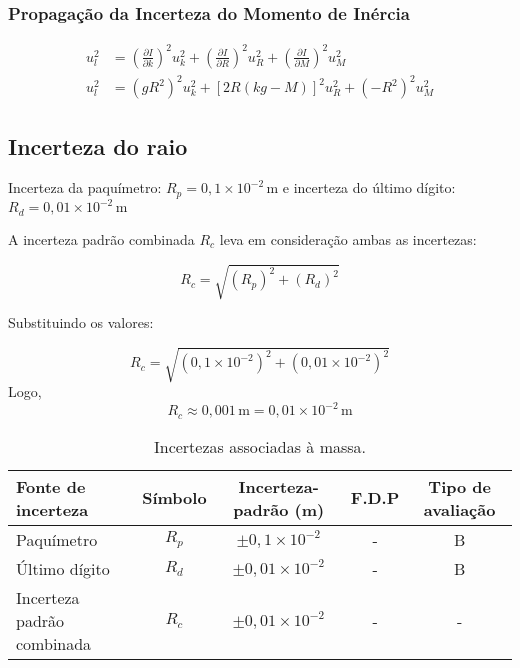 \documentclass[a4papper, 10pt]{article}
\begin{document}
\subsubsection{Propagação da Incerteza do Momento de Inércia}
\vspace{0.10 cm}
\begin{center}
\begin{equation*}
\boxed{
\begin{aligned}
u_l^2 &= \left(\frac{\partial I}{\partial k}\right)^2 u_k^2 + \left(\frac{\partial I}{\partial R}\right)^2 u_R^2 + \left(\frac{\partial I}{\partial M}\right)^2 u_M^2 \\
u_l^2 &= (gR^2)^2 u_k^2 + \left[2R(kg - M)\right]^2 u_R^2 + \left(-R^2\right)^2 u_M^2
\end{aligned}
}
\end{equation*}
\end{center}
\vspace{0.10 cm}

\subsection{Incerteza do raio}

Incerteza da paquímetro: \( R_p = 0{,}1 \times 10^{-2} \, \text{m} \) e incerteza do último dígito: \( R_d = 0{,}01 \times 10^{-2} \, \text{m} \)

A incerteza padrão combinada \( R_c \) leva em consideração ambas as incertezas:

\[
R_c = \sqrt{ (R_p)^2 + (R_d)^2 }
\]

Substituindo os valores:

\[
R_c = \sqrt{ \left(0{,}1 \times 10^{-2}\right)^2 + \left(0{,}01 \times 10^{-2}\right)^2 }
\]
Logo, 
\[
R_c \approx 0{,}001 \, \text{m} = 0{,}01 \times 10^{-2} \, \text{m}
\]

\begin{table}[H]
\centering
\begin{tabular}{|l|c|c|c|c|}
\hline
\textbf{Fonte de incerteza} & \textbf{Símbolo} & \textbf{Incerteza-padrão (m)} & \textbf{F.D.P} & \textbf{Tipo de avaliação} \\
\hline
Paquímetro & \(\textit{R}_p\) & $\pm 0,1 \times 10^{-2}$ & - & B  \\
Último dígito & \(\textit{R}_d\) & $\pm 0,01 \times 10^{-2}$ & - & B \\
Incerteza padrão combinada & \(\textit{R}_c\) & $\pm 0,01 \times 10^{-2}$ & - & - \\
\hline
\end{tabular}
\caption{Incertezas associadas à massa.}
\end{table}
\end{document}
